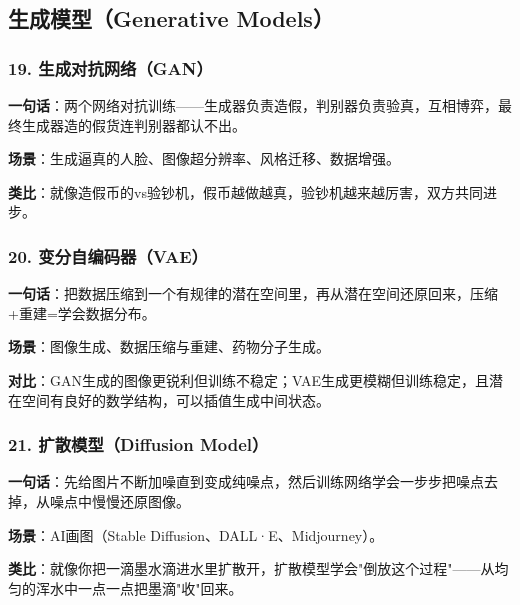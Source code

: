 \documentclass[12pt,a4paper]{ctexart}
\begin{document}
\subsection{生成模型（Generative Models）}

\subsubsection{19. 生成对抗网络（GAN）}

\begin{funbox}[GAN]
\textbf{一句话}：两个网络对抗训练——生成器负责造假，判别器负责验真，互相博弈，最终生成器造的假货连判别器都认不出。

\textbf{场景}：生成逼真的人脸、图像超分辨率、风格迁移、数据增强。

\textbf{类比}：就像造假币的vs验钞机，假币越做越真，验钞机越来越厉害，双方共同进步。
\end{funbox}

\subsubsection{20. 变分自编码器（VAE）}

\begin{funbox}[VAE]
\textbf{一句话}：把数据压缩到一个有规律的潜在空间里，再从潜在空间还原回来，压缩+重建=学会数据分布。

\textbf{场景}：图像生成、数据压缩与重建、药物分子生成。

\textbf{对比}：GAN生成的图像更锐利但训练不稳定；VAE生成更模糊但训练稳定，且潜在空间有良好的数学结构，可以插值生成中间状态。
\end{funbox}

\subsubsection{21. 扩散模型（Diffusion Model）}

\begin{funbox}
\textbf{一句话}：先给图片不断加噪直到变成纯噪点，然后训练网络学会一步步把噪点去掉，从噪点中慢慢还原图像。

\textbf{场景}：AI画图（Stable Diffusion、DALL·E、Midjourney）。

\textbf{类比}：就像你把一滴墨水滴进水里扩散开，扩散模型学会"倒放这个过程"——从均匀的浑水中一点一点把墨滴"收"回来。
\end{funbox}

\end{document}
